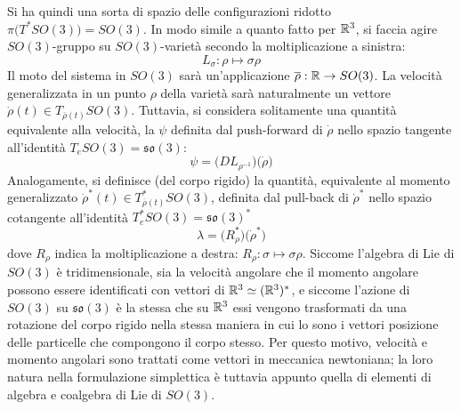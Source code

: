 Si ha quindi una sorta di spazio delle configurazioni ridotto $\pi\big(T^*SO(3)\big) = SO(3)$. In modo simile a quanto fatto per $\mathbb{R}^3$, si faccia agire $SO(3)$-gruppo su $SO(3)$-varietà secondo la moltiplicazione a sinistra:
\begin{equation*}
L_{\sigma}: \rho \longmapsto \sigma \rho 
\end{equation*} 
Il moto del sistema in $SO(3)$ sarà un'applicazione $\overline{\rho}: \mathbb{R} \to SO(3)$. La velocità generalizzata in un punto $\rho$ della varietà sarà naturalmente un vettore $\dot{\rho}(t) \in T_{\overline{\rho}(t)}SO(3)$. Tuttavia, si considera solitamente una quantità equivalente alla velocità, la  $\psi$ definita dal push-forward di $\dot{\rho}$ nello spazio tangente all'identità $T_e SO(3) = \mathfrak{so(3)}$:
\begin{equation*}
\psi = \big(D L_{\rho^{-1}}\big)\big(\dot{\rho}\big)
\end{equation*}
Analogamente, si definisce  (del corpo rigido) la quantità, equivalente al momento generalizzato $\dot{\rho}^*(t) \in T^*_{\overline{\rho}(t)}SO(3)$, definita dal pull-back di $\dot{\rho}^*$ nello spazio cotangente all'identità $T^*_e SO(3) = \mathfrak{so(3)}^*$
\begin{equation*}
\lambda = \big(R^*_{\rho} \big)\big(\dot{\rho}^*\big)
\end{equation*} 
dove $R_\rho$ indica la moltiplicazione a destra: $R_\rho: \sigma \mapsto \sigma \rho$. Siccome l'algebra di Lie di $SO(3)$ è tridimensionale, sia la velocità angolare che il momento angolare possono essere identificati con vettori di $\mathbb{R}^3 \simeq (\mathbb{R}^3)^*$, e siccome l'azione di $SO(3)$ su $\mathfrak{so(3)}$ è la stessa che su $\mathbb{R}^3$ essi vengono trasformati da una rotazione del corpo rigido nella stessa maniera in cui lo sono i vettori posizione delle particelle che compongono il corpo stesso. Per questo motivo, velocità e momento angolari sono trattati come vettori in meccanica newtoniana; la loro natura nella formulazione simplettica è tuttavia appunto quella di elementi di algebra e coalgebra di Lie di $SO(3)$.

